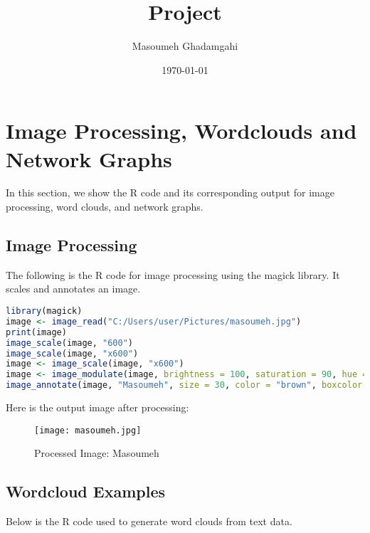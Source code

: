 \documentclass{article}
\title{Project}
\author{Masoumeh Ghadamgahi}
\date{\today}
\begin{document}
\maketitle

\section*{Image Processing, Wordclouds and Network Graphs}

In this section, we show the R code and its corresponding output for image processing, word clouds, and network graphs.

\subsection*{Image Processing}

The following is the R code for image processing using the magick library. It scales and annotates an image.

\begin{lstlisting}[language=R]
library(magick)
image <- image_read("C:/Users/user/Pictures/masoumeh.jpg")
print(image)
image_scale(image, "600")
image_scale(image, "x600")
image <- image_scale(image, "x600")
image <- image_modulate(image, brightness = 100, saturation = 90, hue = 100)
image_annotate(image, "Masoumeh", size = 30, color = "brown", boxcolor = "ivory", font = "Forte", strokecolor = "black", degrees = 0, location = "+300+0")
\end{lstlisting}

Here is the output image after processing:

\begin{figure}[h!]
  \centering
  \texttt{[image: masoumeh.jpg]} %
  \caption{Processed Image: Masoumeh}
  \label{fig:processed_image}
\end{figure}

\newpage

\subsection*{Wordcloud Examples}

Below is the R code used to generate word clouds from text data.
\end{document}
